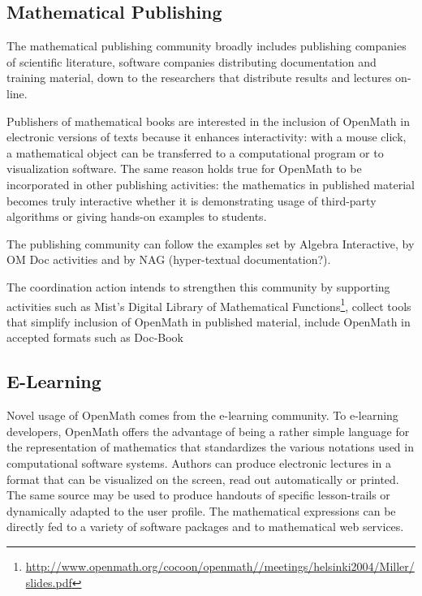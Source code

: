 \documentclass[draft]{artikel3}
\begin{document}
\subsection{Mathematical Publishing}
\label{sec:mpubl}

The mathematical publishing community broadly includes publishing
companies of scientific literature, software companies distributing
documentation and training material, down to the researchers that
distribute results and lectures on-line.

Publishers of mathematical books are interested in the inclusion of
OpenMath in electronic versions of texts because it enhances
interactivity: with a mouse click, a mathematical object can be
transferred to a computational program or to visualization software.
The same reason holds true for OpenMath to be incorporated in other
publishing activities: the mathematics in published material becomes
truly interactive whether it is demonstrating usage of third-party
algorithms or giving hands-on examples to students.

The publishing community can follow the examples set by Algebra
Interactive, by OM Doc activities and by NAG (hyper-textual
documentation?).

The coordination action intends to strengthen this community by
supporting activities such as Mist's Digital Library of Mathematical
Functions\footnote{\url{http://www.openmath.org/cocoon/openmath//meetings/helsinki2004/Miller/slides.pdf}},
collect tools that simplify inclusion of OpenMath in published
material, include OpenMath in accepted formats such as
Doc-Book


\subsection{E-Learning}
\label{sec:e-learn}
Novel usage of OpenMath comes from the e-learning community. To
e-learning developers, OpenMath offers the advantage of being a rather
simple language for the representation of mathematics that
standardizes the various notations used in computational software
systems. Authors can produce electronic lectures in a format that can
be visualized on the screen, read out automatically or printed. The
same source may be used to produce handouts of specific lesson-trails
or dynamically adapted to the user profile. The mathematical
expressions can be directly fed to a variety of software packages and
to mathematical web services.
\end{document}
